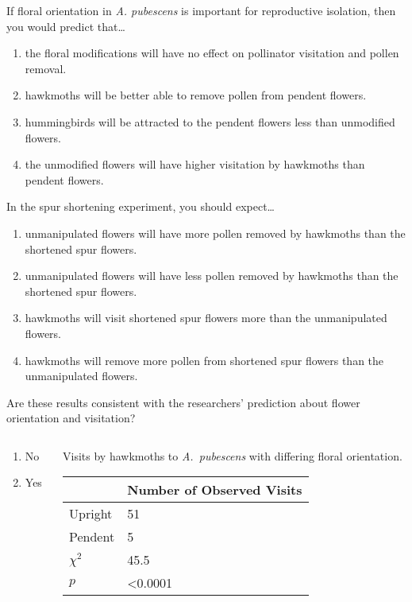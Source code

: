 \documentclass[t,hidelinks]{beamer}
\newcommand{\ques}[1]{\highlight{\textsc{q#1:}}}
\begin{document}
%
\begin{frame}[t]{\ques9 If floral orientation in \textit{A. pubescens} is important for reproductive isolation, then you would predict that\dots}
	
	
	\begin{enumerate}
		\item the floral modifications will have no effect on pollinator visitation and pollen removal.
		\item hawkmoths will be better able to remove pollen from pendent flowers.
		\item hummingbirds will be attracted to the pendent flowers less than unmodified flowers.
		\item \alert<2>{the unmodified flowers will have higher visitation by hawkmoths than pendent flowers.}
	\end{enumerate}
\end{frame}
%
\begin{frame}[t]{\ques{10} In the spur shortening experiment, you should expect\dots}
	\begin{enumerate}
		\item \alert<2>{unmanipulated flowers will have more pollen removed by hawkmoths than the shortened spur flowers.}
		\item unmanipulated  flowers will have less pollen removed by hawkmoths than the shortened spur flowers.
		\item hawkmoths will visit shortened spur flowers more than the unmanipulated flowers.
		\item hawkmoths will remove more pollen from shortened spur flowers than the unmanipulated flowers.
	\end{enumerate}

\end{frame}
%
\begin{frame}[t]{\ques{11} Are these results consistent with the researchers’ prediction about flower orientation and visitation?}
	
	\begin{columns}[t]
		\begin{column}{0.28\textwidth}
			\begin{enumerate}
				\item No
				\item \alert<2>{Yes}
			\end{enumerate}
		\end{column}
		\begin{column}{0.5\textwidth}
	Visits by hawkmoths to \textit{A.~pubescens} with differing floral orientation.
	
	\begin{tabular}{L{0.6in}R{1in}}
		\toprule
		& Number of Observed Visits \tabularnewline
		\midrule
		Upright		&	51	 \tabularnewline
		Pendent		&	5	 \tabularnewline
		$\chi^2$	&	45.5 \tabularnewline
		$p$			&  \textless0.0001 \tabularnewline
		\bottomrule
	\end{tabular}
\end{column}
	\end{columns}
\end{frame}
\end{document}
